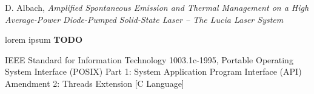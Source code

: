 \begin{thebibliography}{9}


    D. Albach,
    \emph{Amplified Spontaneous Emission and Thermal Management on a High Average-Power Diode-Pumped Solid-State Laser \--- The Lucia Laser System}

    lorem ipsum
    \textbf{TODO}

    IEEE Standard for Information Technology 1003.1c-1995, 
    Portable Operating System Interface (POSIX) Part 1: System Application Program Interface (API) Amendment 2: Threads Extension [C Language]


\end{thebibliography}
